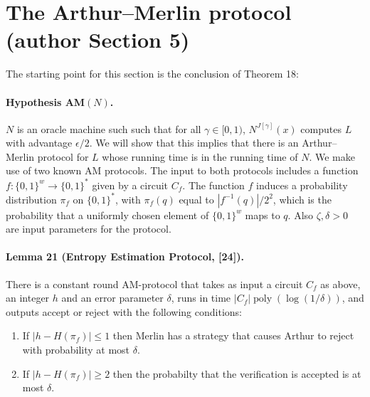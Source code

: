 \section*{The Arthur--Merlin protocol (author Section 5)}
The starting point for this section is the conclusion of Theorem 18:
\paragraph{Hypothesis AM$(N)$.} $N$ is an oracle machine such such that for all $\gamma\in[0,1)$, $N^{J[\gamma]}(x)$ computes $L$ with advantage $\epsilon/2$.
We will show that this implies that there is an Arthur--Merlin protocol for $L$ whose running time is in the running time of $N$.
We make use of two known AM protocols. The input to both protocols includes a function $f:\{0,1\}^w\longrightarrow\{0,1\}^*$ given by a circuit $C_f$. The function $f$ induces a probability distribution $\pi_f$ on $\{0,1\}^*$, with $\pi_f(q)$ equal to $|f^{-1}(q)|/2^2$, which is the probability that a uniformly chosen element of $\{0,1\}^w$ maps to $q$. Also $\zeta,\delta>0$ are input parameters for the protocol.
\paragraph{Lemma 21 (Entropy Estimation Protocol, [24]).} There is a constant round AM-protocol that takes as input a circuit $C_f$ as above, an integer $h$ and an error parameter $\delta$, runs in time $|C_f|\operatorname{poly}(\log(1/\delta))$, and outputs accept or reject with the following conditions:
\begin{enumerate}\item If $|h-H(\pi_f)|\le1$ then Merlin has a strategy that causes Arthur to reject with probability at most $\delta$.
\item If $|h-H(\pi_f)|\ge2$ then the probabilty that the verification is accepted is at most $\delta$.\end{enumerate}

